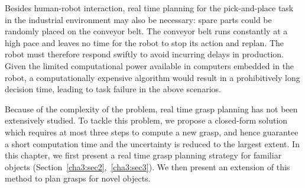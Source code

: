Besides human-robot interaction, real time planning for the pick-and-place task in the industrial environment may also be necessary: spare parts could be randomly placed on the conveyor belt.
The conveyor belt runs constantly at a high pace and leaves no time for the robot to stop its action and replan.
The robot must therefore respond swiftly to avoid incurring delays in production. Given the limited computational power available in computers embedded in the robot, a computationally expensive algorithm would result in a prohibitively long decision time, leading to task failure in the above scenarios.

Because of the complexity of the problem, real time grasp planning has not been extensively studied. To tackle this problem, we propose a closed-form solution which requires at most three steps to compute a new grasp, and hence guarantee a short computation time and the uncertainty is reduced to the largest extent. In this chapter, we first present a real time grasp planning strategy for familiar objects (Section~\ref{cha3:sec2},~\ref{cha3:sec3}). We then present an extension of this method to plan grasps for novel objects.




